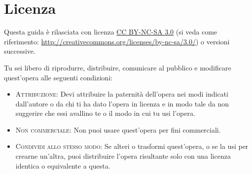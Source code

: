 \chapter*{Licenza}
Questa guida è rilasciata con licenza \href{http://creativecommons.org/licenses/by-nc-sa/3.0/}{CC BY-NC-SA 3.0} (si veda come riferimento: \href{http://creativecommons.org/licenses/by-nc-sa/3.0/}{http://creativecommons.org/licenses/by-nc-sa/3.0/}) o versioni successive. 

Tu sei libero di riprodurre, distribuire, comunicare al pubblico e modificare quest’opera alle seguenti condizioni:
\begin{itemize}
\item \textsc{Attribuzione}: Devi attribuire la paternità dell’opera nei modi indicati dall’autore o da chi ti ha dato l’opera in licenza e in modo tale da non suggerire che essi avallino te o il modo in cui tu usi l’opera.
\item \textsc{Non commerciale}: Non puoi usare quest’opera per fini commerciali.
\item \textsc{Condividi allo stesso modo}: Se alteri o trasformi quest’opera, o se la usi per crearne un’altra, puoi distribuire l’opera risultante solo con una licenza identica o equivalente a questa.
\end{itemize}

